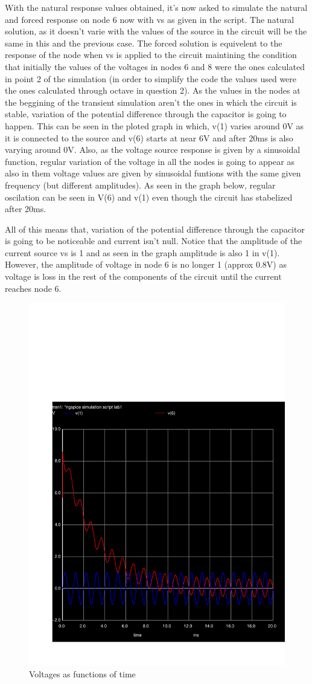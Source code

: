 \par With the natural response values obtained, it's now asked to simulate the natural and forced response on node 6 now with vs as given in the script. The natural solution, as it doesn't varie with the values of the source in the circuit will be the same in this and the previous case. The forced solution is equivelent to the response of the node when vs is applied to the circuit maintining the condition that initially the values of the voltages in nodes 6 and 8 were the ones calculated in point 2 of the simulation (in order to simplify the code the values used were the ones calculated through octave in question 2). As the values in the nodes at the beggining of the transient simulation aren't the ones in which the circuit is stable, variation of the potential difference through the capacitor is going to happen. This can be seen in the ploted graph in which, v(1) varies around 0V as it is connected to the source and v(6) starts at near 6V and after 20ms is also varying around 0V. Also, as the voltage source response is given by a sinusoidal function, regular variation of the voltage in all the nodes is going to appear as also in them voltage values are given by sinusoidal funtions with the same given frequency (but different amplitudes). As seen in the graph below, regular oscilation can be seen in V(6) and v(1) even though the circuit has stabelized after 20ms.
\par All of this means that, variation of the potential difference through the capacitor is going to be noticeable and current isn't null. Notice that the amplitude of the current source vs is 1 and as seen in the graph amplitude is also 1 in v(1). However, the amplitude of voltage in node 6 is no longer 1 (approx 0.8V) as voltage is loss in the rest of the components of the circuit until the current reaches node 6. 

\begin{figure}[h] \centering
\includegraphics[width=0.6\linewidth]{teste_4.pdf}
\caption{Voltages as functions of time}
\label{fig:V(t)}
\end{figure}

